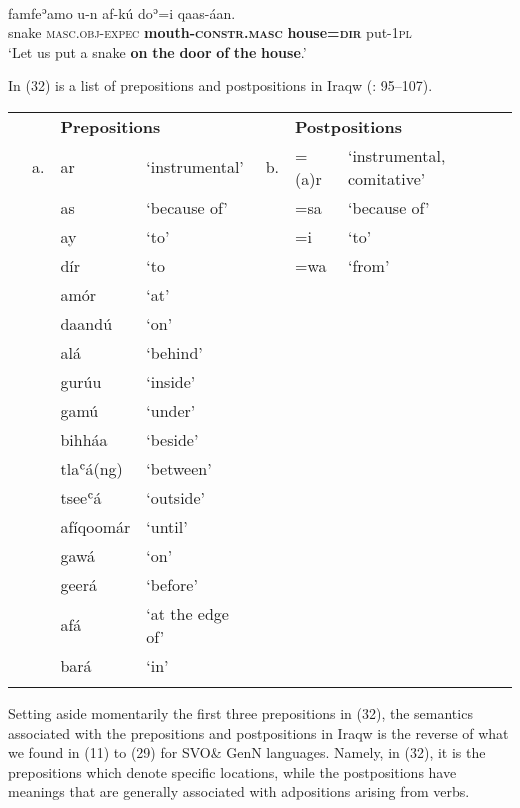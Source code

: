 \documentclass[output=paper]{langsci/langscibook}
\begin{document}
\ea\label{ex:dryer:}
\\
\gll famfeʾamo  u-n  af-kú  doʾ=i  qaas-áan.\\
       snake  \textsc{masc.obj-expec}  \textbf{mouth-\textsc{constr.masc}}  \textbf{house=\textsc{dir}}  put-\textsc{1pl}  \\
\glt ‘Let us put a snake \textbf{on} \textbf{the} \textbf{door} \textbf{of} \textbf{the} \textbf{house}.’
\z

In (32) is a list of prepositions and postpositions in Iraqw (\citealt{Mous1993}: 95–107).


\begin{table}
\begin{tabularx}{\textwidth}{XXXXXXX}
\lsptoprule
&  & \multicolumn{2}{X}{\bfseries Prepositions} &  & \multicolumn{2}{X}{\bfseries Postpositions}\\
& a. & ar & ‘instrumental’ & b. & =(a)r & ‘instrumental, comitative’\\
&  & as & ‘because of’ &  & =sa & ‘because of’\\
&  & ay & ‘to’ &  & =i & ‘to’\\
&  & dír & ‘to &  & =wa & ‘from’\\
&  & amór & ‘at’ &  &  & \\
&  & daandú & ‘on’ &  &  & \\
&  & alá & ‘behind’ &  &  & \\
&  & gurúu & ‘inside’ &  &  & \\
&  & gamú & ‘under’ &  &  & \\
&  & bihháa & ‘beside’ &  &  & \\
&  & tlaʿá(ng) & ‘between’ &  &  & \\
&  & tseeʿá & ‘outside’ &  &  & \\
&  & afíqoomár & ‘until’ &  &  & \\
&  & gawá & ‘on’ &  &  & \\
&  & geerá & ‘before’ &  &  & \\
&  & afá & ‘at the edge of’ &  &  & \\
&  & bará & ‘in’ &  &  & \\
\lspbottomrule
\end{tabularx}
\end{table}

Setting aside momentarily the first three prepositions in (32), the semantics associated with the prepositions and postpositions in Iraqw is the reverse of what we found in (11) to (29) for SVO\& GenN languages. Namely, in (32), it is the prepositions which denote specific locations, while the postpositions have meanings that are generally associated with adpositions arising from verbs.
\end{document}
